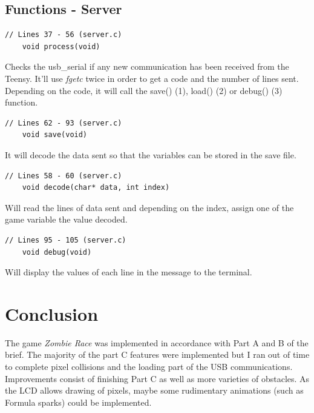 \documentclass{article}
\begin{document}
\subsection*{Functions - Server}
\begin{lstlisting}[style=CStyle]
	// Lines 37 - 56 (server.c)
	void process(void)
\end{lstlisting}
Checks the usb\_serial if any new communication has been received from the Teensy. It'll use \emph{fgetc} twice in order to get a code and the number of lines sent. Depending on the code, it will call the save() (1), load() (2) or debug() (3) function.
\begin{lstlisting}[style=CStyle]
	// Lines 62 - 93 (server.c)
	void save(void)
\end{lstlisting}
It will decode the data sent so that the variables can be stored in the save file.
\begin{lstlisting}[style=CStyle]
	// Lines 58 - 60 (server.c)
	void decode(char* data, int index)
\end{lstlisting}
Will read the lines of data sent and depending on the index, assign one of the game variable the value decoded.
\begin{lstlisting}[style=CStyle]
	// Lines 95 - 105 (server.c)
	void debug(void)
\end{lstlisting}
Will display the values of each line in the message to the terminal.
\clearpage

\section{Conclusion}
The game \emph{Zombie Race} was implemented in accordance with Part A and B of the brief. The majority of the part C features were implemented but I ran out of time to complete pixel collisions and the loading part of the USB communications.
\newline
Improvements consist of finishing Part C as well as more varieties of obstacles. As the LCD allows drawing of pixels, maybe some rudimentary animations (such as Formula sparks) could be implemented.
\end{document}
